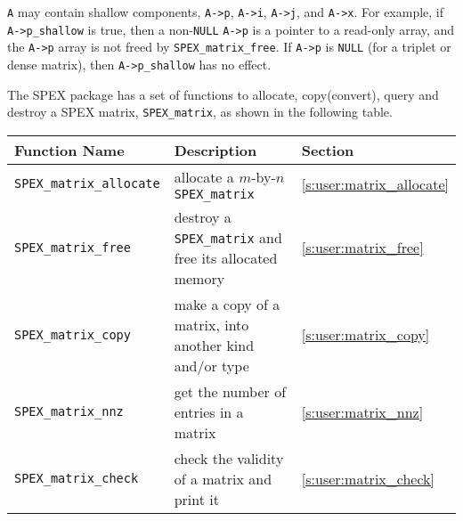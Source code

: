 \documentclass[12pt,oneside]{book}
\theoremstyle{definition}
\newenvironment{SizedCenteredTabular}[2][\small]
    {   
        #1\begin{center}\begin{tabular}{#2}
    }{ 
        \end{tabular}\end{center}
    }
\begin{document}
\verb|A| may contain shallow components, \verb|A->p|, \verb|A->i|, \verb|A->j|,
and \verb|A->x|.  For example, if \verb|A->p_shallow| is true, then a
non-\verb|NULL| \verb|A->p| is a pointer to a read-only array, and the
\verb|A->p| array is not freed by \verb|SPEX_matrix_free|.  If \verb|A->p| is
\verb|NULL| (for a triplet or dense matrix), then \verb|A->p_shallow| has no
effect.



%
%

The SPEX package has a set of functions to allocate, copy(convert), query and
destroy a SPEX matrix, \verb|SPEX_matrix|, as shown in the following table.

\begin{SizedCenteredTabular}{lp{2.5in}l} \hline
        Function Name & Description & Section \\ \hline
        \verb|SPEX_matrix_allocate|
            & allocate a $m$-by-$n$ \verb|SPEX_matrix|
            & \ref{s:user:matrix_allocate} \\ \hline
        \verb|SPEX_matrix_free|
            & destroy a \verb|SPEX_matrix| and free its allocated memory
            & \ref{s:user:matrix_free} \\ \hline
        \verb|SPEX_matrix_copy|
            & make a copy of a matrix, into another kind and/or type
            & \ref{s:user:matrix_copy} \\ \hline
        \verb|SPEX_matrix_nnz|
            & get the number of entries in a matrix
            & \ref{s:user:matrix_nnz} \\ \hline
        \verb|SPEX_matrix_check|
            & check the validity of a matrix and print it
            & \ref{s:user:matrix_check} \\ \hline
\end{SizedCenteredTabular}
\end{document}

